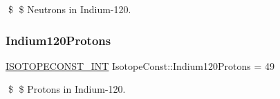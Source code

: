 \$ \$ Neutrons in Indium-\/120. \mbox{\label{group___isotope_const-_indium-_in120_ga4e3c89a50ad20b4bcaab4435593caa92}} 
\subsubsection{\texorpdfstring{Indium120\+Protons}{Indium120Protons}}
{\footnotesize\ttfamily \mbox{\hyperlink{group___isotope_const-_macros_ga5f18360b3e99483a35c32d789e62621c}{I\+S\+O\+T\+O\+P\+E\+C\+O\+N\+S\+T\+\_\+\+I\+NT}} Isotope\+Const\+::\+Indium120\+Protons = 49}

\$ \$ Protons in Indium-\/120. 